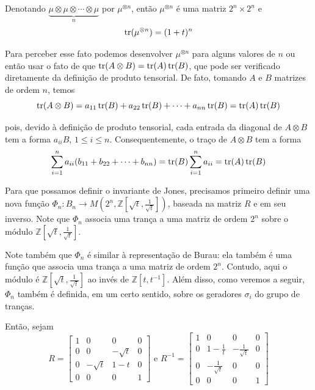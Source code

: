 	\par\vspace{0.3cm} Denotando $\underbrace{\mu\otimes\mu\otimes\cdots\otimes\mu}_{n}$ por $\mu^{\otimes n}$, então $\mu^{\otimes n}$ é uma matriz $2^n\times 2^n$ e 
	\begin{equation}
	\label{mi tensor n vezes}
	\operatorname{tr}(\mu^{\otimes n}) = (1+t)^n
	\end{equation}
	\par\vspace{0.3cm} Para perceber esse fato podemos desenvolver $\mu^{\otimes n}$ para alguns valores de $n$ ou então usar o fato de que $\operatorname{tr}(A\otimes B) = \operatorname{tr}(A)\operatorname{tr}(B)$, que pode ser verificado diretamente da definição de produto tensorial. De fato, tomando $A$ e $B$ matrizes de ordem $n$, temos
	\begin{equation*}
	\operatorname{tr}(A\otimes B) = a_{11}\operatorname{tr}(B) + a_{22}\operatorname{tr}(B) + \cdots + a_{nn}\operatorname{tr}(B) = \operatorname{tr}(A)\operatorname{tr}(B)
	\end{equation*}
	\par\vspace{0.3cm} pois, devido à definição de produto tensorial, cada entrada da diagonal de $A\otimes B$ tem a forma $a_{ii}B$, $1\leq i\leq n$. Consequentemente, o traço de $A\otimes B$ tem a forma
	\begin{equation*}
	\sum_{i=1}^{n}a_{ii}(b_{11} + b_{22} + \cdots + b_{nn}) = \operatorname{tr}(B)\sum_{i=1}^{n}a_{ii} = \operatorname{tr}(A)\operatorname{tr}(B)
	\end{equation*}
	\par\vspace{0.3cm} Para que possamos definir o invariante de Jones, precisamos primeiro definir uma nova função $\Phi_n: B_n\to M(2^n, \mathbb{Z}[\sqrt{t}, \frac{1}{\sqrt{t}}])$, baseada na matriz $R$ e em seu inverso. Note que $\Phi_n$ associa uma trança a uma matriz de ordem $2^n$ sobre o módulo $\mathbb{Z}[\sqrt{t}, \frac{1}{\sqrt{t}}]$. 
	\par\vspace{0.3cm} Note também que $\Phi_n$ é similar à representação de Burau: ela também é uma função que associa uma trança a uma matriz de ordem $2^n$. Contudo, aqui o módulo é $\mathbb{Z}[\sqrt{t}, \frac{1}{\sqrt{t}}]$ ao invés de $\mathbb{Z}[t, t^{-1}]$. Além disso, como veremos a seguir, $\Phi_n$ também é definida, em um certo sentido, sobre os geradores $\sigma_i$ do grupo de tranças.
	\par\vspace{0.3cm} Então, sejam
	\begin{equation*}
	R = \begin{bmatrix}
	1 & 0 & 0 & 0 \\
	0 & 0 & -\sqrt{t} & 0 \\
	0 & -\sqrt{t} & 1-t & 0 \\
	0 & 0 & 0 & 1
	\end{bmatrix}\text{ e }R^{-1} = \begin{bmatrix}
	1 & 0 & 0 & 0 \\
	0 & 1 - \frac{1}{t} & -\frac{1}{\sqrt{t}} & 0 \\
	0 & -\frac{1}{\sqrt{t}} & 0 & 0 \\
	0 & 0 & 0 & 1
	\end{bmatrix}
	\end{equation*}

